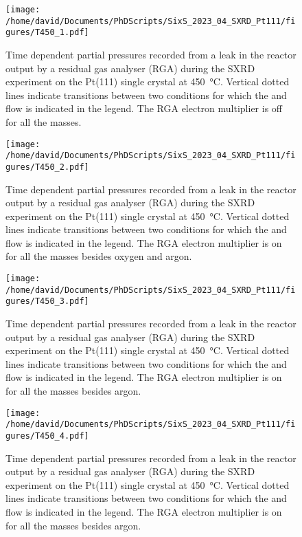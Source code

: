 \begin{figure}[!htb]
    \centering
    \texttt{[image: /home/david/Documents/PhDScripts/SixS\_2023\_04\_SXRD\_Pt111/figures/T450\_1.pdf]}
    \caption{
        Time dependent partial pressures recorded from a leak in the reactor output by a residual gas analyser (RGA) during the SXRD experiment on the Pt(111) single crystal at \qty{450}{\degreeCelsius}.
        Vertical dotted lines indicate transitions between two conditions for which the  and  flow is indicated in the legend.
        The RGA electron multiplier is off for all the masses.
    }
    \label{fig:RGA450Pt111_1}
\end{figure}

\begin{figure}[!htb]
    \centering
    \texttt{[image: /home/david/Documents/PhDScripts/SixS\_2023\_04\_SXRD\_Pt111/figures/T450\_2.pdf]}
    \caption{
        Time dependent partial pressures recorded from a leak in the reactor output by a residual gas analyser (RGA) during the SXRD experiment on the Pt(111) single crystal at \qty{450}{\degreeCelsius}.
        Vertical dotted lines indicate transitions between two conditions for which the  and  flow is indicated in the legend.
        The RGA electron multiplier is on for all the masses besides oxygen and argon.
    }
    \label{fig:RGA450Pt111_2}
\end{figure}

\begin{figure}[!htb]
    \centering
    \texttt{[image: /home/david/Documents/PhDScripts/SixS\_2023\_04\_SXRD\_Pt111/figures/T450\_3.pdf]}
    \caption{
        Time dependent partial pressures recorded from a leak in the reactor output by a residual gas analyser (RGA) during the SXRD experiment on the Pt(111) single crystal at \qty{450}{\degreeCelsius}.
        Vertical dotted lines indicate transitions between two conditions for which the  and  flow is indicated in the legend.
        The RGA electron multiplier is on for all the masses besides argon.
    }
    \label{fig:RGA450Pt111_3}
\end{figure}

\begin{figure}[!htb]
    \centering
    \texttt{[image: /home/david/Documents/PhDScripts/SixS\_2023\_04\_SXRD\_Pt111/figures/T450\_4.pdf]}
    \caption{
        Time dependent partial pressures recorded from a leak in the reactor output by a residual gas analyser (RGA) during the SXRD experiment on the Pt(111) single crystal at \qty{450}{\degreeCelsius}.
        Vertical dotted lines indicate transitions between two conditions for which the  and  flow is indicated in the legend.
        The RGA electron multiplier is on for all the masses besides argon.
    }
    \label{fig:RGA450Pt111_4}
\end{figure}